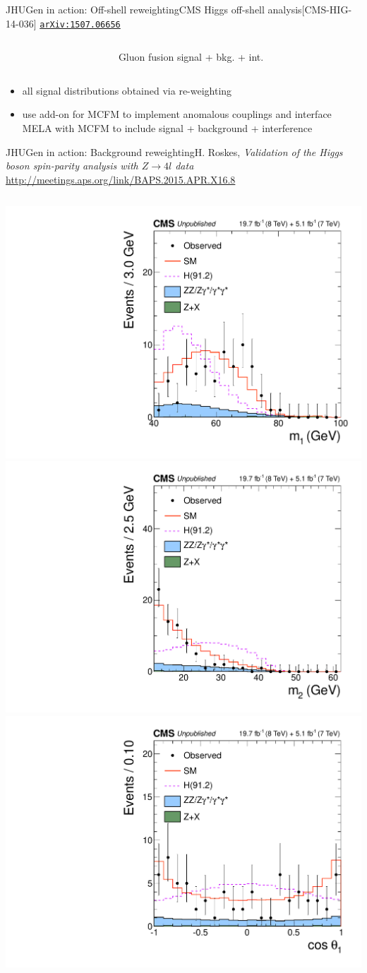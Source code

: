 \documentclass[usenames,dvipsnames,svgnames,table]{beamer}
\newcommand{\arxiv}[1]{\href{http://arxiv.org/abs/#1}{\nolinkurl{arXiv:#1}}}
\begin{document}
\begin{frame}{JHUGen in action: Off-shell reweighting}{CMS Higgs off-shell analysis\hfill [CMS-HIG-14-036] \arxiv{1507.06656}}
\begin{columns}
\begin{column}{0.75\textwidth}
\end{column}
\begin{column}{0.15\textwidth}
Gluon fusion signal + bkg. + int.
\end{column}
\end{columns}
\begin{itemize} \footnotesize
\item all signal distributions obtained via re-weighting
\item use add-on for MCFM to implement anomalous couplings and interface MELA with MCFM to include signal + background + interference
\end{itemize}
\end{frame}

\begin{frame}{JHUGen in action: Background reweighting}{H. Roskes, \emph{Validation of the Higgs boson spin-parity
analysis with $Z\to 4l$ data}\\ \url{http://meetings.aps.org/link/BAPS.2015.APR.X16.8}}
\begin{columns}
\begin{column}{0.55\textwidth}
\includegraphics[width=.5\columnwidth]{HVV/Z4lm1}
\includegraphics[width=.5\columnwidth]{HVV/Z4lm2} \\
\includegraphics[width=.5\columnwidth]{HVV/Z4lcostheta1}

\end{column}
\end{columns}
\end{frame}
\end{document}
